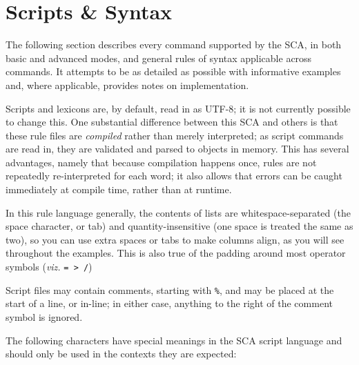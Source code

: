 \documentclass[10pt,letterpaper]{article}
\begin{document}

\section{Scripts \& Syntax}\label{sec:syntax}
The following section describes every command supported by the SCA, in both basic and advanced modes, and general rules of syntax applicable across commands. It attempts to be as detailed as possible with informative examples and, where applicable, provides notes on implementation.

Scripts and lexicons are, by default, read in as UTF-8; it is not currently possible to change this. One substantial difference between this SCA and others is that these rule files are \emph{compiled} rather than merely interpreted; as script commands are read in, they are validated and parsed to objects in memory. This has several advantages, namely that because compilation happens once, rules are not repeatedly re-interpreted for each word; it also allows that errors can be caught immediately at compile time, rather than at runtime.

In this rule language generally, the contents of lists are whitespace-separated (the space character, or tab) and quantity-insensitive (one space is treated the same as two), so you can use extra spaces or tabs to make columns align, as you will see throughout the examples. This is also true of the padding around most operator symbols (\emph{viz.} \texttt{= > /})


Script files may contain comments, starting with \texttt{\%}, and may be placed at the start of a line, or in-line; in either case, anything to the right of the comment symbol is ignored.

The following characters have special meanings in the SCA script language and should only be used in the contexts they are expected:
\end{document}
